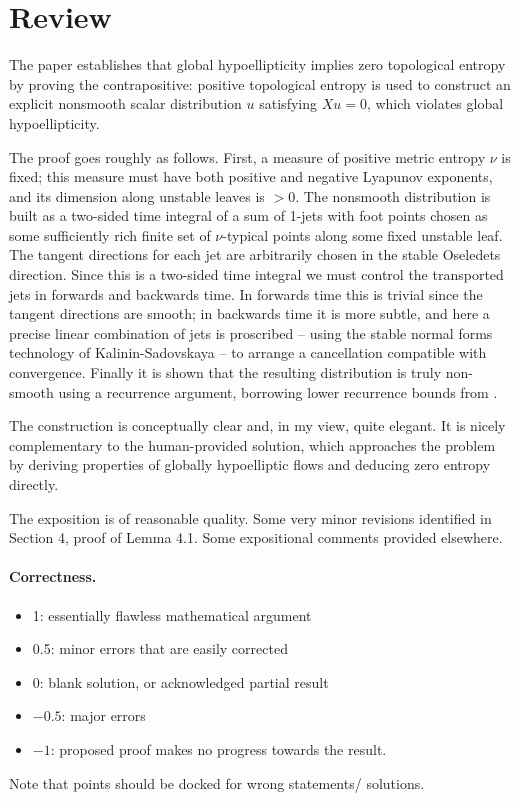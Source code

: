 \documentclass[11pt]{article}
\theoremstyle{remark}
\begin{document}
\maketitle

\section{Review}
{\color{gray} The paper establishes that global hypoellipticity implies zero topological entropy by proving the contrapositive: positive topological entropy is used to construct an explicit nonsmooth scalar distribution $u$ satisfying $Xu = 0$, which violates global hypoellipticity. 

The proof goes roughly as follows. First, a measure of positive metric entropy $\nu$ is fixed; this measure must have both positive and negative Lyapunov exponents, and its dimension along unstable leaves is $> 0$. The nonsmooth distribution is built as a two-sided time integral of a sum of 1-jets with foot points chosen as some sufficiently rich finite set of $\nu$-typical points along some fixed unstable leaf. The tangent directions for each jet are arbitrarily chosen in the stable Oseledets direction. Since this is a two-sided time integral we must control the transported jets in forwards and backwards time. In forwards time this is trivial since the tangent directions are smooth; in backwards time it is more subtle, and here a precise linear combination of jets is proscribed -- using the stable normal forms technology of Kalinin-Sadovskaya \cite{KalininSadovskaya2017} -- to arrange a cancellation compatible with convergence. Finally it is shown that the resulting distribution is truly non-smooth using a recurrence argument, borrowing lower recurrence bounds from \cite{Saussol2004}. 

The construction is conceptually clear and, in my view, quite elegant. It is nicely complementary to the human-provided solution, which approaches the problem by deriving properties of globally hypoelliptic flows and deducing zero entropy directly. 

The exposition is of reasonable quality. Some very minor revisions identified in Section 4, proof of Lemma 4.1. Some expositional comments provided elsewhere. }

\paragraph{Correctness.}
\begin{itemize}
	\item  1: essentially flawless mathematical argument
	\item  0.5: minor errors that are easily corrected
	\item  0: blank solution, or acknowledged partial result
	\item  $-0.5$: major errors
	\item  $-1$: proposed proof makes no progress towards the result.
\end{itemize}
Note that points should be docked for wrong statements/ solutions.
\end{document}
